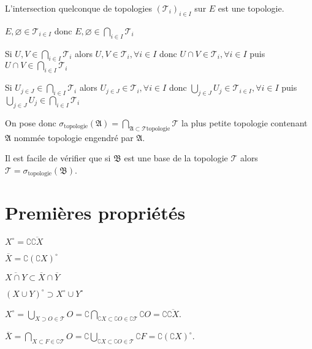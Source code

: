 \documentclass[a4paper, 11pt, french]{book}
\newenvironment{itemise}{\itemize}{\enditemize}
\theoremstyle{plain} %
\theoremstyle{definition} %
\theoremstyle{remark} %
\newcommand{\1}{\mathds{1}}
\newcommand\vide{\varnothing}
\begin{document}
\proposition
L'intersection quelconque de topologies $(\mathscr{T}_i)_{i\in I}$ sur $E$ est une topologie.
\demonstration
\begin{itemise}
	\item $E, \vide\in\mathscr{T}_{i\in I}$ donc $E, \vide\in\bigcap_{i\in I}\mathscr{T}_i$
	\item Si $U, V\in\bigcap_{i\in I}\mathscr{T}_i$ alors $U, V\in\mathscr{T}_i, \forall i\in I$ donc $U\cap V\in\mathscr{T}_i, \forall i\in I$ puis $U\cap V\in\bigcap_{i\in I}\mathscr{T}_i$
	\item Si $U_{j\in J}\in\bigcap_{i\in I}\mathscr{T}_i$ alors $U_{j\in J}\in\mathscr{T}_i, \forall i\in I$ donc $\bigcup_{j\in J} U_j\in\mathscr{T}_{i\in I}, \forall i\in I$ puis $\bigcup_{j\in J} U_j\in\bigcap_{i\in I}\mathscr{T}_i$
\end{itemise}

On pose donc $\sigma_\text{topologie}(\mathfrak{A})=\bigcap_{\mathfrak{A}\subset\mathscr{T}\text{topologie}}\mathscr{T}$ la plus petite topologie contenant $\mathfrak{A}$ nommée topologie engendré par $\mathfrak{A}$.

\remarque
Il est facile de vérifier que si $\mathfrak{B}$ est une base de la topologie $\mathscr{T}$ alors $\mathscr{T}=\sigma_\text{topologie}(\mathfrak{B})$.


\section{Premières propriétés}

\proposition
\begin{itemise}
	\item $X^\circ=\complement\overline{\complement X}$
	\item $\overline{X}=\complement(\complement X)^\circ$
	\item $\overline{X\cap Y}\subset\overline{X}\cap\overline{Y}$
	\item $(X\cup Y)^\circ\supset X^\circ\cup Y^\circ$
\end{itemise}

\demonstration

$X^\circ=\bigcup_{X\supset O\in\mathscr{T}}O=\complement\bigcap_{\complement X\subset\complement O\in\complement\mathscr{T}}\complement O=\complement\overline{\complement X}$.

$\overline{X}=\bigcap_{X\subset F\in\complement\mathscr{T}}O=\complement\bigcup_{\complement X\subset\complement O\in\mathscr{T}}\complement F=\complement(\complement X)^\circ$.
\end{document}
